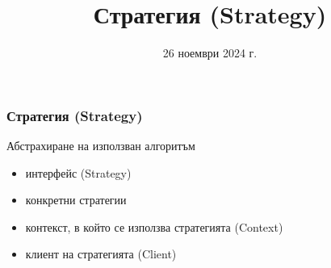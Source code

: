 \documentclass[alsotrans]{beamerswitch}
\title{Стратегия (Strategy)}
\date{26 ноември 2024 г.}
\begin{document}
\begin{frame}
  \titlepage
\end{frame}

\begin{frame}
  \frametitle{Стратегия (Strategy)}
  
  \begin{purpose}
    Абстрахиране на използван алгоритъм
  \end{purpose}

  \pause
  \vspace{2ex}
  \comps
  \begin{itemize}[<+->]
  \item интерфейс (Strategy)
  \item конкретни стратегии
  \item контекст, в който се използва стратегията (Context)
  \item клиент на стратегията (Client)
  \end{itemize}
\end{frame}
\end{document}
